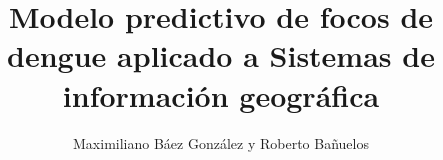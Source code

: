 \documentclass[final,fmstyle]{./util/ucathesis}
\title{Modelo predictivo de focos de dengue aplicado a Sistemas de informaci\'on geogr\'afica}
\author{Maximiliano B\'{a}ez Gonz\'{a}lez y Roberto Ba\~{n}uelos}
\begin{document}
\maketitle     %

%


\tableofcontents
\listoffigures
\listoftables
\listofalgorithms
%
\listofsymbols


\mainmatter  %

%
%
%

%
%
%
%



\appendix   %
%
\printbibliography
\end{document}

